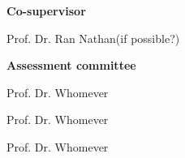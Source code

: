     \vspace{6mm}

    \textbf{Co-supervisor}
    \begin{description}
        \item Prof. Dr. Ran Nathan(if possible?)
    \end{description}

    \vspace{6mm}

    \textbf{Assessment committee}
    \begin{description}
        \item Prof. Dr. Whomever
        \item Prof. Dr. Whomever
        \item Prof. Dr. Whomever
    \end{description}


